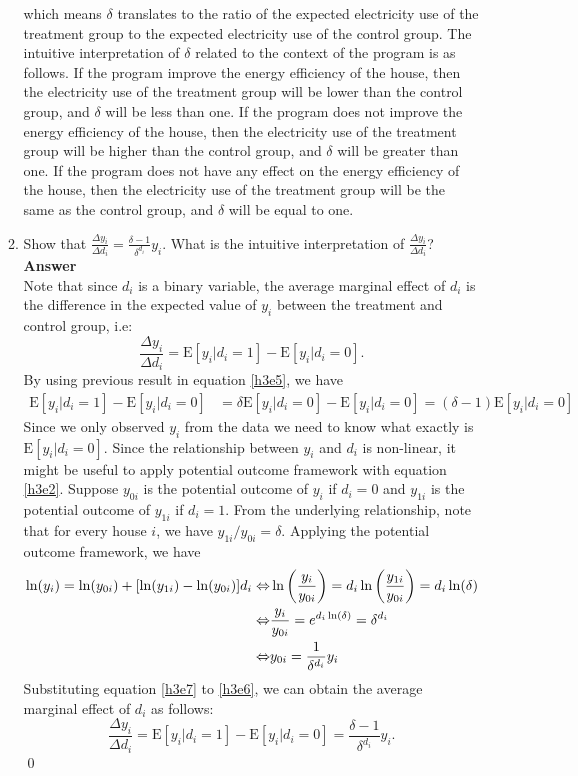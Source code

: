 \documentclass{article}
\newcommand{\E}{\text{E}}
\begin{document}
\begin{enumerate}
\begin{enumerate}
    which means $\delta$ translates to the ratio of the expected electricity use of the treatment group to the expected electricity use of the control group. The intuitive interpretation of $\delta$ related to the context of the program is as follows. If the program improve the energy efficiency of the house, then the electricity use of the treatment group will be lower than the control group, and $\delta$ will be less than one. If the program does not improve the energy efficiency of the house, then the electricity use of the treatment group will be higher than the control group, and $\delta$ will be greater than one. If the program does not have any effect on the energy efficiency of the house, then the electricity use of the treatment group will be the same as the control group, and $\delta$ will be equal to one.
    \item Show that $\frac{\Delta y_i}{\Delta d_i}=\frac{\delta-1}{\delta^{d_i}}y_i$. What is the intuitive interpretation of $\frac{\Delta y_i}{\Delta d_i}$?
    \\\textbf{Answer}\\
    Note that since $d_i$ is a binary variable, the average marginal effect of $d_i$ is the difference in the expected value of $y_i$ between the treatment and control group, i.e:
    \[\frac{\Delta y_i}{\Delta d_i}=\E[y_i|d_i=1]-\E[y_i|d_i=0].\]
    By using previous result in equation \eqref{h3e5}, we have 
    \begin{align}
        \E[y_i|d_i=1]-\E[y_i|d_i=0]&=\delta\E[y_i|d_i=0]-\E[y_i|d_i=0]=(\delta-1)\E[y_i|d_i=0] \label{h3e6}
    \end{align}
    Since we only observed $y_i$ from the data we need to know what exactly is $\E[y_i|d_i=0]$. Since the relationship between $y_i$ and $d_i$ is non-linear, it might be useful to apply potential outcome framework with equation \eqref{h3e2}. Suppose $y_{0i}$ is the potential outcome of $y_i$ if $d_i=0$ and $y_{1i}$ is the potential outcome of $y_{1i}$ if $d_i=1$. From the underlying relationship, note that for every house $i$, we have $y_{1i}/y_{0i}=\delta$. Applying the potential outcome framework, we have
    \begin{align}
        \ln(y_i)=\ln(y_{0i})+[\ln(y_{1i})-\ln(y_{0i})]d_i
        \Leftrightarrow& \ln\left(\frac{y_i}{y_{0i}}\right)=d_i\ln\left(\frac{y_{1i}}{y_{0i}}\right)=d_i\ln(\delta) \notag\\
        \Leftrightarrow& \frac{y_i}{y_{0i}}=e^{d_i\ln(\delta)}=\delta^{d_i} \notag\\
        \Leftrightarrow& y_{0i}=\frac{1}{\delta^{d_i}}y_i \label{h3e7}
    \end{align}
    Substituting equation \eqref{h3e7} to \eqref{h3e6}, we can obtain the average marginal effect of $d_i$ as follows:
    \[\frac{\Delta y_i}{\Delta d_i}=\E[y_i|d_i=1]-\E[y_i|d_i=0]=\frac{\delta-1}{\delta^{d_i}}y_i.\]\qed


\end{enumerate}
\end{enumerate}
\end{document}
